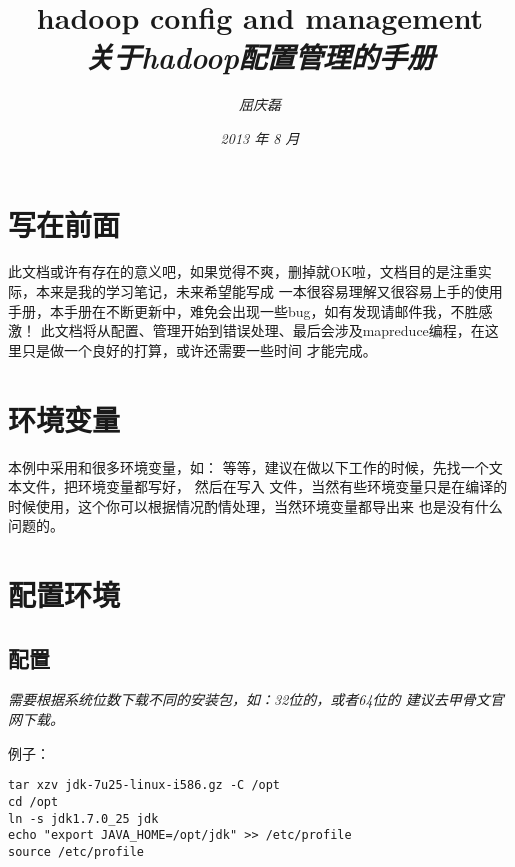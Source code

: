 \documentclass{article}
\begin{document}
\title{%
  {\huge \textsf{hadoop config and management}\\\smallskip}%
  {\small \textit{关于hadoop配置管理的手册}}
}

\author{\textit{屈庆磊}\\[2mm]
       }

\date{\textit{2013 年 8 月}}

\maketitle
\begin{multicols}{2}
\tableofcontents
\end{multicols}

\section{写在前面}
此文档或许有存在的意义吧，如果觉得不爽，删掉就OK啦，文档目的是注重实际，本来是我的学习笔记，未来希望能写成
一本很容易理解又很容易上手的使用手册，本手册在不断更新中，难免会出现一些bug，如有发现请邮件我，不胜感激！
此文档将从配置、管理开始到错误处理、最后会涉及mapreduce编程，在这里只是做一个良好的打算，或许还需要一些时间
才能完成。

\section{环境变量}
本例中采用和很多环境变量，如： 等等，建议在做以下工作的时候，先找一个文本文件，把环境变量都写好，
然后在写入 文件，当然有些环境变量只是在编译的时候使用，这个你可以根据情况酌情处理，当然环境变量都导出来
也是没有什么问题的。

\section{配置环境}
\subsection{配置}
\textit{需要根据系统位数下载不同的安装包，如：32位的，或者64位的
建议去甲骨文官网下载。
}

\textsf{例子：}
\begin{verbatim}
tar xzv jdk-7u25-linux-i586.gz -C /opt
cd /opt
ln -s jdk1.7.0_25 jdk
echo "export JAVA_HOME=/opt/jdk" >> /etc/profile
source /etc/profile
\end{verbatim}
\end{document}
